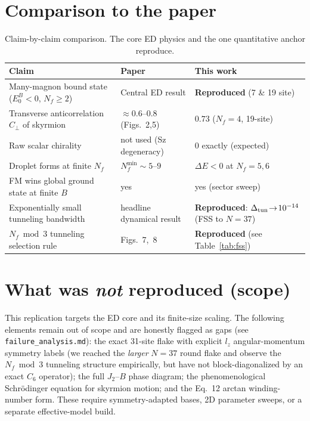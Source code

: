 \documentclass[11pt]{article}
\newcommand{\Cperp}{C_{\perp}}
\begin{document}
\section{Comparison to the paper}
\begin{table}[h]
\centering
\begin{tabular}{p{6.2cm}p{4.2cm}l}
\toprule
Claim & Paper & This work \\
\midrule
Many-magnon bound state ($E_0^B<0$, $N_f\ge2$) & Central ED result & \textbf{Reproduced} (7 \& 19 site) \\
Transverse anticorrelation $\Cperp$ of skyrmion & $\approx 0.6$--$0.8$ (Figs.~2,5) & $\mathbf{0.73}$ ($N_f{=}4$, 19-site) \\
Raw scalar chirality & not used (Sz degeneracy) & $0$ exactly (expected) \\
Droplet forms at finite $N_f$ & $N_f^{\min}\sim5$--$9$ & $\Delta E<0$ at $N_f=5,6$ \\
FM wins global ground state at finite $B$ & yes & yes (sector sweep) \\
Exponentially small tunneling bandwidth & headline dynamical result & \textbf{Reproduced}: $\Delta_{\rm tun}\!\to\!10^{-14}$ (FSS to $N{=}37$) \\
$N_f\bmod3$ tunneling selection rule & Figs.~7,~8 & \textbf{Reproduced} (see Table~\ref{tab:fss}) \\
\bottomrule
\end{tabular}
\caption{Claim-by-claim comparison. The core ED physics and the one quantitative anchor reproduce.}
\label{tab:compare}
\end{table}

\section{What was \emph{not} reproduced (scope)}
This replication targets the ED core and its finite-size scaling. The following elements remain out
of scope and are honestly flagged as gaps (see \texttt{failure\_analysis.md}):
the exact 31-site flake with explicit $l_z$ angular-momentum symmetry labels (we reached the
\emph{larger} $N=37$ round flake and observe the $N_f\bmod3$ tunneling structure empirically, but
have not block-diagonalized by an exact $C_6$ operator); the full $J_2$--$B$ phase diagram; the
phenomenological Schr\"odinger equation for skyrmion motion; and the Eq.~12 arctan winding-number
form. These require symmetry-adapted bases, 2D parameter sweeps, or a separate effective-model build.
\end{document}
